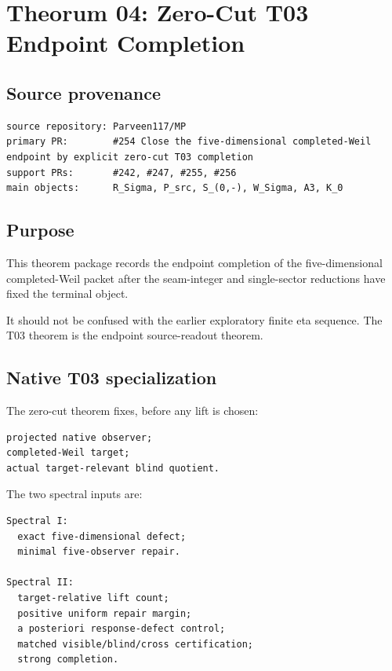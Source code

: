 \hypertarget{theorum-04-zero-cut-t03-endpoint-completion}{%
\chapter{Theorum 04: Zero-Cut T03 Endpoint Completion}\label{theorum-04-zero-cut-t03-endpoint-completion}}

\hypertarget{source-provenance}{%
\section{Source provenance}\label{source-provenance}}

\begin{verbatim}
source repository: Parveen117/MP
primary PR:        #254 Close the five-dimensional completed-Weil endpoint by explicit zero-cut T03 completion
support PRs:       #242, #247, #255, #256
main objects:      R_Sigma, P_src, S_(0,-), W_Sigma, A3, K_0
\end{verbatim}

\hypertarget{purpose}{%
\section{Purpose}\label{purpose}}

This theorem package records the endpoint completion of the five-dimensional completed-Weil packet after the seam-integer and single-sector reductions have fixed the terminal object.

It should not be confused with the earlier exploratory finite eta sequence. The T03 theorem is the endpoint source-readout theorem.

\hypertarget{native-t03-specialization}{%
\section{Native T03 specialization}\label{native-t03-specialization}}

The zero-cut theorem fixes, before any lift is chosen:

\begin{verbatim}
projected native observer;
completed-Weil target;
actual target-relevant blind quotient.
\end{verbatim}

The two spectral inputs are:

\begin{verbatim}
Spectral I:
  exact five-dimensional defect;
  minimal five-observer repair.

Spectral II:
  target-relative lift count;
  positive uniform repair margin;
  a posteriori response-defect control;
  matched visible/blind/cross certification;
  strong completion.
\end{verbatim}


